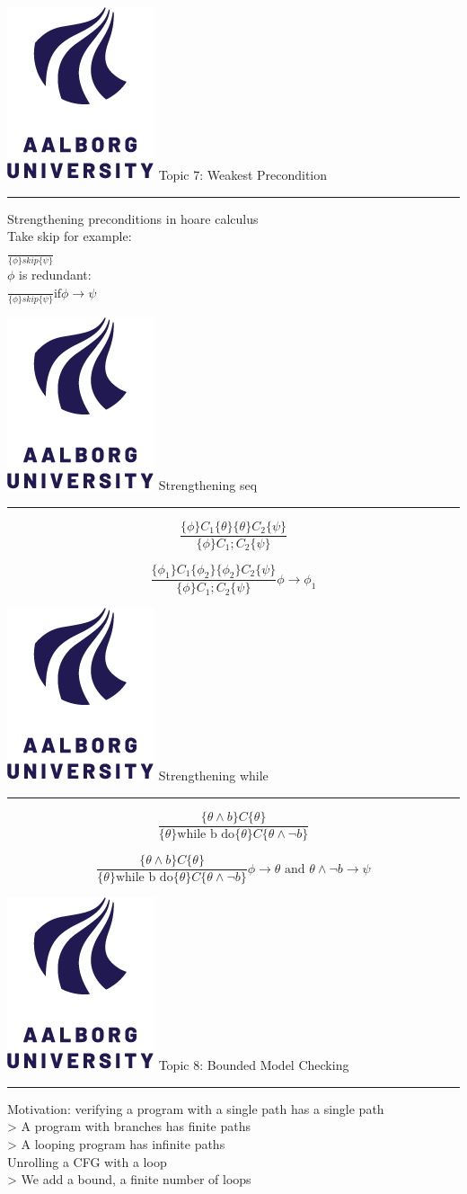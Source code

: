 \documentclass[aspectratio=1610,17pt,utf8]{beamer}
\newcommand{\mainframe}[1]{\color{blue} \includegraphics[width=.05\textwidth]{figures/aau.png} #1\\\hrule}
\newcommand{\mf}[1]{\mainframe{#1}}
\newcommand{\regularframe}[1]{\color{black}\includegraphics[width=.05\textwidth]{figures/aau.png} #1\\\hrule}
\newcommand{\rf}[1]{\regularframe{#1}}
\begin{document}

\begin{frame}{\mf{Topic 7: Weakest Precondition}}
    Strengthening preconditions in hoare calculus\\
    Take skip for example:\\
    $\frac{}{\{\phi\}skip\{\psi\}}$\\
    $\phi$ is redundant:\\
    $\frac{}{\{\phi\}skip\{\psi\}}\text{if} \phi \rightarrow \psi$
\end{frame}

\begin{frame}{\rf{Strengthening seq}}
    \begin{equation}
        \frac{\{\phi\}C_1\{\theta\} \{\theta\}C_2\{\psi\}}{\{\phi\}C_1;C_2\{\psi\}}
    \end{equation}

    \begin{equation}
        \frac{\{\phi_1\}C_1\{\phi_2\} \{\phi_2\}C_2\{\psi\}}{\{\phi\}C_1;C_2\{\psi\}}\phi \rightarrow \phi_1
    \end{equation}
\end{frame}

\begin{frame}{\rf{Strengthening while}}
    \begin{equation}
        \frac{\{\theta\land b\}C\{\theta\}}{\{\theta\}\text{while b do}\{\theta\}C\{\theta\land\lnot b\}}
    \end{equation}

    \begin{equation}
        \frac{\{\theta\land b\}C\{\theta\}}{\{\theta\}\text{while b do}\{\theta\}C\{\theta\land\lnot b\}} \phi \rightarrow \theta \text{ and } \theta \land \lnot b \rightarrow \psi
    \end{equation}

\end{frame}


\begin{frame}{\mf{Topic 8: Bounded Model Checking}} %
    Motivation: verifying a program with a single path has a single path\\
    > A program with branches has finite paths\\
    > A looping program has infinite paths\\
    Unrolling a CFG with a loop\\
    > We add a bound, a finite number of loops

\end{frame}
\end{document}
